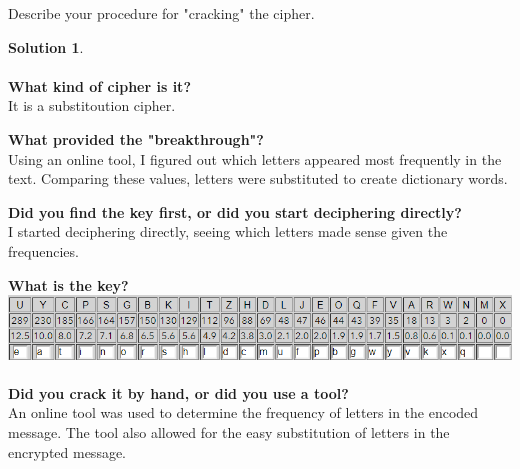 \documentclass{article}
\theoremstyle{definition}
\newtheorem*{solution}{Solution}
\begin{document}
\noindent
Describe your procedure for "cracking" the cipher.

\begin{solution}\ \\ \ \\
\indent 
\textbf{What kind of cipher is it?}\ \\
\indent It is a substitoution cipher.

\textbf{What provided the "breakthrough"?}\ \\
\indent Using an online tool, I figured out which letters appeared most frequently in the text. Comparing these values, letters were substituted to create dictionary words.

\textbf{Did you find the key first, or did you start deciphering directly?}\ \\
\indent I started deciphering directly, seeing which letters made sense given the frequencies.

\textbf{What is the key?}\ \\
\includegraphics[width=\textwidth,height=\textheight,keepaspectratio]{39568ffdefe30f32bc60e606f4fe08fe.png}\ \\

\textbf{Did you crack it by hand, or did you use a tool?}\ \\
An online tool was used to determine the frequency of letters in the encoded message. The tool also allowed for the easy substitution of letters in the encrypted message.

\end{solution}
\end{document}
